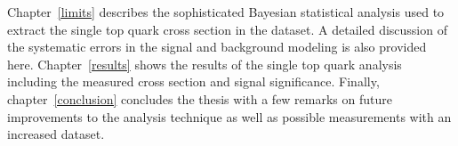 Chapter~\ref{limits} describes the sophisticated Bayesian statistical analysis used to extract the single top quark cross section in the dataset. A detailed discussion of the systematic errors in the signal and background modeling is also provided here. Chapter~\ref{results} shows the results of the single top quark analysis including the measured cross section and signal significance. Finally, chapter~\ref{conclusion} concludes the thesis with a few remarks on future improvements to the analysis technique as well as possible measurements with an increased dataset.